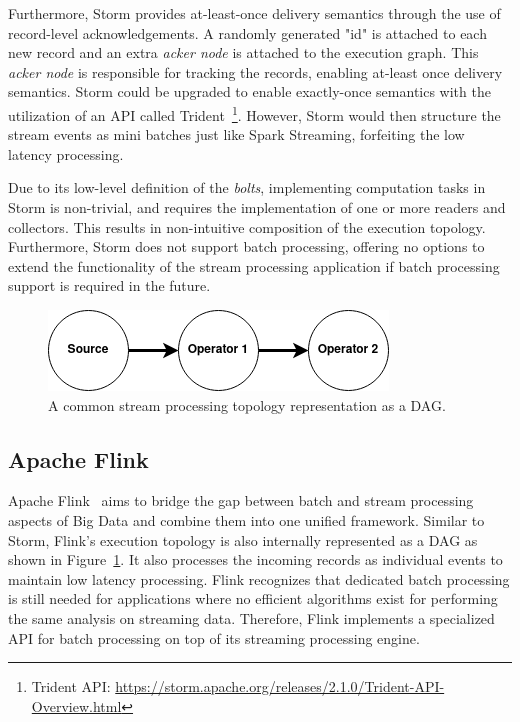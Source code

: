 Furthermore, Storm provides at-least-once 
delivery semantics through the use of record-level acknowledgements. A randomly 
generated "id" is attached to each new record and an extra \emph{acker node} is attached 
to the execution graph. This \emph{acker node} is responsible for tracking the records, 
enabling at-least once delivery semantics. Storm could be upgraded to enable 
exactly-once semantics with the utilization of an API called
Trident~\footnote{Trident API: \url{https://storm.apache.org/releases/2.1.0/Trident-API-Overview.html}}. 
However, Storm would then structure the stream events as mini batches just like 
Spark Streaming, forfeiting the low latency processing. 

Due to its low-level definition of the \emph{bolts}, implementing computation tasks 
in Storm is non-trivial, and requires the implementation of one or more readers and 
collectors. This results in non-intuitive composition of the execution topology. 
Furthermore, Storm does not support 
batch processing, offering no options to extend the functionality of the stream 
processing application if batch processing support is required in the future. 


\begin{figure}[!htpb]
    \centering
    \includegraphics[width=0.5\linewidth]{fig/dag.png}
    \caption{A common stream processing topology representation as a DAG.} 
    \label{fig:dag_topology}
\end{figure}

\subsection{Apache Flink}%
\label{sub:Apache Flink}

Apache Flink~\cite{flink} aims to bridge the gap between batch and stream processing aspects of 
Big Data and combine them into one unified framework. Similar to Storm, 
Flink's execution topology is also internally represented as a DAG as shown 
in Figure~\ref{fig:dag_topology}. It also processes the incoming records as 
individual events to maintain low latency processing. Flink recognizes that
dedicated batch processing is still needed for applications where no efficient algorithms 
exist for performing the same analysis on streaming data. Therefore, Flink implements a 
specialized API for batch processing on top of its streaming processing engine.

